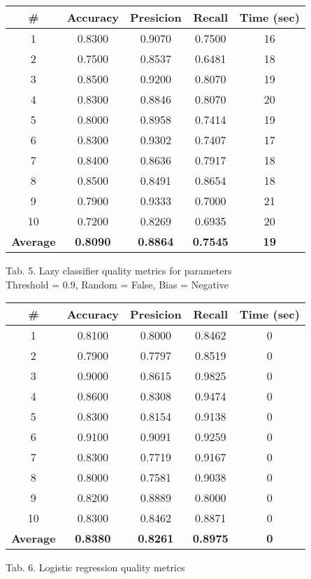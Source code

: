 \documentclass{article}
\begin{document}
\begin{center}
    \begin{tabular}{|c|c|c|c|c|}
        \hline
        \# & \textbf{Accuracy} & \textbf{Presicion} & \textbf{Recall} & \textbf{Time (sec)} \\
        \hline
        1	& 0.8300	& 0.9070	& 0.7500	& 16 \\
        2	& 0.7500	& 0.8537	& 0.6481	& 18 \\
        3	& 0.8500	& 0.9200	& 0.8070	& 19 \\
        4	& 0.8300	& 0.8846	& 0.8070	& 20 \\
        5	& 0.8000	& 0.8958	& 0.7414	& 19 \\
        6	& 0.8300	& 0.9302	& 0.7407	& 17 \\
        7	& 0.8400	& 0.8636	& 0.7917	& 18 \\
        8	& 0.8500	& 0.8491	& 0.8654	& 18 \\
        9	& 0.7900	& 0.9333	& 0.7000	& 21 \\
        10	& 0.7200	& 0.8269	& 0.6935	& 20 \\
        \hline
        \textbf{Average} & \textbf{0.8090} & \textbf{0.8864} & \textbf{0.7545} & \textbf{19} \\
        \hline
    \end{tabular}
    
    Tab. 5. Lazy classifier quality metrics for parameters \\ Threshold = 0.9, Random = False, Bias = Negative
\end{center}

\begin{center}
    \begin{tabular}{|c|c|c|c|c|}
        \hline
        \# & \textbf{Accuracy} & \textbf{Presicion} & \textbf{Recall} & \textbf{Time (sec)} \\
        \hline
        1	& 0.8100	& 0.8000	& 0.8462	& 0 \\
        2	& 0.7900	& 0.7797	& 0.8519	& 0 \\
        3	& 0.9000	& 0.8615	& 0.9825	& 0 \\
        4	& 0.8600	& 0.8308	& 0.9474	& 0 \\
        5	& 0.8300	& 0.8154	& 0.9138	& 0 \\
        6	& 0.9100	& 0.9091	& 0.9259	& 0 \\
        7	& 0.8300	& 0.7719	& 0.9167	& 0 \\
        8	& 0.8000	& 0.7581	& 0.9038	& 0 \\
        9	& 0.8200	& 0.8889	& 0.8000	& 0 \\
        10	& 0.8300	& 0.8462	& 0.8871	& 0 \\
        \hline
        \textbf{Average} & \textbf{0.8380} & \textbf{0.8261} & \textbf{0.8975} & \textbf{0} \\
        \hline
    \end{tabular}
    
    Tab. 6. Logistic regression quality metrics
\end{center}
\end{document}
